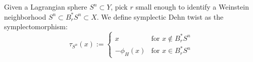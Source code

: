 

    Given a Lagrangian sphere $S^n\subset Y$, pick $r$ small enough to identify a Weinstein neighborhood  $S^n\subset B_r^*S^n\subset X$. 
    We define symplectic Dehn twist as the symplectomorphism:
    \[\tau_{S^n}(x):=\left\{\begin{array}{cc} x & \text{for $x\not\in B_r^*S^n$}\\
        -\phi_H(x) & \text{for $x\in B_r^*S^n$}
    \end{array}\right.\]
